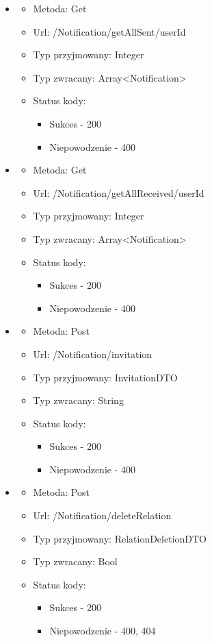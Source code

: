 \documentclass[12pt,a4paper]{article}
\begin{document}
\begin{enumerate}
\begin{itemize}
		\item 
		\begin{itemize}
			\item Metoda: Get
			\item Url: /Notification/getAllSent/{userId}
			\item Typ przyjmowany: Integer
			\item Typ zwracany: Array<Notification>
			\item Status kody: 
			\begin{itemize}
				\item Sukces - 200
				\item Niepowodzenie - 400
			\end{itemize}
		\end{itemize}
		
		\item 
		\begin{itemize}
			\item Metoda: Get
			\item Url: /Notification/getAllReceived/{userId}
			\item Typ przyjmowany: Integer
			\item Typ zwracany: Array<Notification>
			\item Status kody: 
			\begin{itemize}
				\item Sukces - 200
				\item Niepowodzenie - 400
			\end{itemize}
		\end{itemize}
	
		\item 
		\begin{itemize}
			\item Metoda: Post
			\item Url: /Notification/invitation
			\item Typ przyjmowany: InvitationDTO
			\item Typ zwracany: String
			\item Status kody: 
			\begin{itemize}
				\item Sukces - 200
				\item Niepowodzenie - 400
			\end{itemize}
		\end{itemize}
	
		\item 
		\begin{itemize}
			\item Metoda: Post
			\item Url: /Notification/deleteRelation
			\item Typ przyjmowany: RelationDeletionDTO
			\item Typ zwracany: Bool
			\item Status kody: 
			\begin{itemize}
				\item Sukces - 200
				\item Niepowodzenie - 400, 404
			\end{itemize}
		\end{itemize}
	

\end{itemize}
\end{enumerate}
\end{document}
